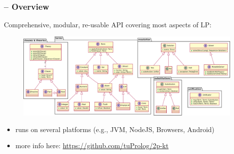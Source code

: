 \documentclass[presentation]{beamer}
\begin{document}
\begin{frame}%
    \frametitle{\twopkt{} -- Overview}

    Comprehensive, modular, re-usable API covering most aspects of LP:
    \begin{figure}
        \includegraphics[width=\linewidth]{img/2p-kt-overview}
    \end{figure}
    \begin{itemize}
        \item runs on several platforms (e.g., JVM, NodeJS, Browsers, Android)
        \item more info here: \url{https://github.com/tuProlog/2p-kt}
    \end{itemize}

\end{frame}
\end{document}
